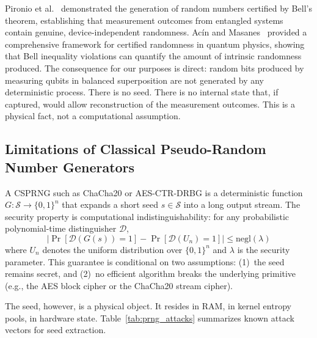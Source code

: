 \documentclass[journal]{IEEEtran}
\begin{document}
Pironio et al.~\cite{pironio2010certified} demonstrated the generation of random numbers certified by Bell's theorem, establishing that measurement outcomes from entangled systems contain genuine, device-independent randomness. Ac\'{i}n and Masanes~\cite{acin2016certified} provided a comprehensive framework for certified randomness in quantum physics, showing that Bell inequality violations can quantify the amount of intrinsic randomness produced. The consequence for our purposes is direct: random bits produced by measuring qubits in balanced superposition are not generated by any deterministic process. There is no seed. There is no internal state that, if captured, would allow reconstruction of the measurement outcomes. This is a physical fact, not a computational assumption.

\subsection{Limitations of Classical Pseudo-Random Number Generators}
\label{subsec:prng}

A CSPRNG such as ChaCha20 or AES-CTR-DRBG is a deterministic function $G\colon \mathcal{S} \to \{0,1\}^n$ that expands a short seed $s \in \mathcal{S}$ into a long output stream. The security property is computational indistinguishability: for any probabilistic polynomial-time distinguisher $\mathcal{D}$,
\begin{equation}
\bigl|\Pr[\mathcal{D}(G(s)) = 1] - \Pr[\mathcal{D}(U_n) = 1]\bigr| \leq \mathrm{negl}(\lambda)
\label{eq:csprng_security}
\end{equation}
where $U_n$ denotes the uniform distribution over $\{0,1\}^n$ and $\lambda$ is the security parameter. This guarantee is conditional on two assumptions: (1)~the seed remains secret, and (2)~no efficient algorithm breaks the underlying primitive (e.g., the AES block cipher or the ChaCha20 stream cipher).

The seed, however, is a physical object. It resides in RAM, in kernel entropy pools, in hardware state. Table~\ref{tab:prng_attacks} summarizes known attack vectors for seed extraction.
\end{document}
